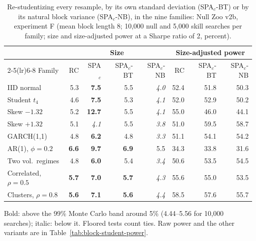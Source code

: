 \begin{table}[t]
\centering
\footnotesize
\setlength{\tabcolsep}{3.5pt}
\caption{Re-studentizing every resample, by its own standard deviation (SPA$_c$-BT) or by its natural block variance (SPA$_c$-NB), in the nine families: Null Zoo v2b, experiment F (mean block length 8; 10{,}000 null and 5{,}000 skill searches per family; size and size-adjusted power at a Sharpe ratio of 2, percent).}
\label{tab:block-student}
\begin{tabular}{lrrrrrrr}
\toprule
 & \multicolumn{4}{c}{Size} & \multicolumn{3}{c}{Size-adjusted power} \\
\cmidrule(lr){2-5}\cmidrule(lr){6-8}
Family & RC & SPA$_c$ & SPA$_c$-BT & SPA$_c$-NB & RC & SPA$_c$-BT & SPA$_c$-NB \\
\midrule
IID normal & 5.3 & \textbf{7.5} & 5.5 & \textit{4.0} & 52.4 & 51.8 & 50.3 \\
Student $t_4$ & 4.6 & \textbf{7.5} & 5.3 & \textit{4.1} & 52.0 & 52.9 & 50.2 \\
Skew $-1.32$ & 5.2 & \textbf{12.7} & 5.5 & \textit{4.1} & 55.0 & 46.0 & 44.1 \\
Skew $+1.32$ & 5.1 & \textit{4.1} & 5.5 & \textit{3.8} & 51.0 & 59.5 & 58.7 \\
GARCH(1,1) & 4.8 & \textbf{6.2} & 4.8 & \textit{3.3} & 51.1 & 54.1 & 54.2 \\
AR(1), $\phi=0.2$ & \textbf{6.6} & \textbf{9.7} & \textbf{6.9} & 5.5 & 34.3 & 33.8 & 31.6 \\
Two vol.\ regimes & 4.8 & \textbf{6.0} & 5.4 & \textit{3.4} & 50.6 & 53.5 & 54.5 \\
Correlated, $\rho=0.5$ & \textbf{5.7} & \textbf{7.0} & \textbf{5.7} & \textit{4.3} & 55.6 & 55.0 & 53.5 \\
Clusters, $\rho=0.8$ & \textbf{5.6} & \textbf{7.1} & \textbf{5.6} & \textit{4.4} & 58.5 & 57.6 & 55.7 \\
\bottomrule
\end{tabular}
\par\smallskip\begin{minipage}{0.97\linewidth}\footnotesize Bold: above the 99\% Monte Carlo band around 5\% (4.44--5.56 for 10{,}000 searches); italic: below it. Floored tests count ties. Raw power and the other variants are in Table~\ref{tab:block-student-power}.\end{minipage}
\end{table}

